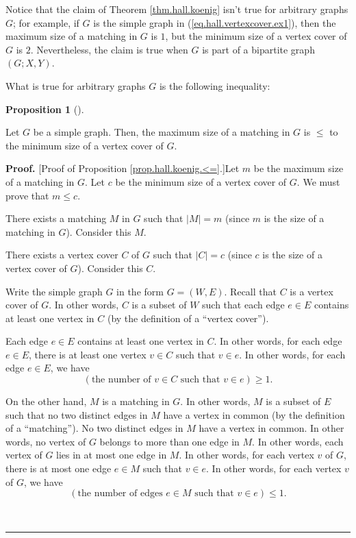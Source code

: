 \documentclass[numbers=enddot,12pt,final,onecolumn,notitlepage]{scrartcl}%
\theoremstyle{definition}
\newtheorem{prop}[theo]{Proposition}
\newenvironment{proposition}[1][]
{\begin{prop}[#1]\begin{leftbar}}
{\end{leftbar}\end{prop}}
\newenvironment{proof}[1][Proof]{\noindent\textbf{#1.} }{\ \rule{0.5em}{0.5em}}
\begin{document}
Notice that the claim of Theorem \ref{thm.hall.koenig} isn't true for
arbitrary graphs $G$; for example, if $G$ is the simple graph in
(\ref{eq.hall.vertexcover.ex1}), then the maximum size of a matching in $G$ is
$1$, but the minimum size of a vertex cover of $G$ is $2$. Nevertheless, the
claim is true when $G$ is part of a bipartite graph $\left(  G;X,Y\right)  $.

What is true for arbitrary graphs $G$ is the following inequality:

\begin{proposition}
\label{prop.hall.koenig.<=}Let $G$ be a simple graph. Then, the maximum size
of a matching in $G$ is $\leq$ to the minimum size of a vertex cover of $G$.
\end{proposition}

\begin{proof}
[Proof of Proposition \ref{prop.hall.koenig.<=}.]Let $m$ be the maximum size
of a matching in $G$. Let $c$ be the minimum size of a vertex cover of $G$. We
must prove that $m\leq c$.

There exists a matching $M$ in $G$ such that $\left\vert M\right\vert =m$
(since $m$ is the size of a matching in $G$). Consider this $M$.

There exists a vertex cover $C$ of $G$ such that $\left\vert C\right\vert =c$
(since $c$ is the size of a vertex cover of $G$). Consider this $C$.

Write the simple graph $G$ in the form $G=\left(  W,E\right)  $. Recall that
$C$ is a vertex cover of $G$. In other words, $C$ is a subset of $W$ such that
each edge $e\in E$ contains at least one vertex in $C$ (by the definition of a
\textquotedblleft vertex cover\textquotedblright).

Each edge $e\in E$ contains at least one vertex in $C$. In other words, for
each edge $e\in E$, there is at least one vertex $v\in C$ such that $v\in e$.
In other words, for each edge $e\in E$, we have%
\begin{equation}
\left(  \text{the number of }v\in C\text{ such that }v\in e\right)  \geq1.
\label{pf.prop.hall.koenig.<=.>=}%
\end{equation}


On the other hand, $M$ is a matching in $G$. In other words, $M$ is a subset
of $E$ such that no two distinct edges in $M$ have a vertex in common (by the
definition of a \textquotedblleft matching\textquotedblright). No two distinct
edges in $M$ have a vertex in common. In other words, no vertex of $G$ belongs
to more than one edge in $M$. In other words, each vertex of $G$ lies in at
most one edge in $M$. In other words, for each vertex $v$ of $G$, there is at
most one edge $e\in M$ such that $v\in e$. In other words, for each vertex $v$
of $G$, we have%
\begin{equation}
\left(  \text{the number of edges }e\in M\text{ such that }v\in e\right)
\leq1. \label{pf.prop.hall.koenig.<=.<=}%
\end{equation}



\end{proof}
\end{document}

